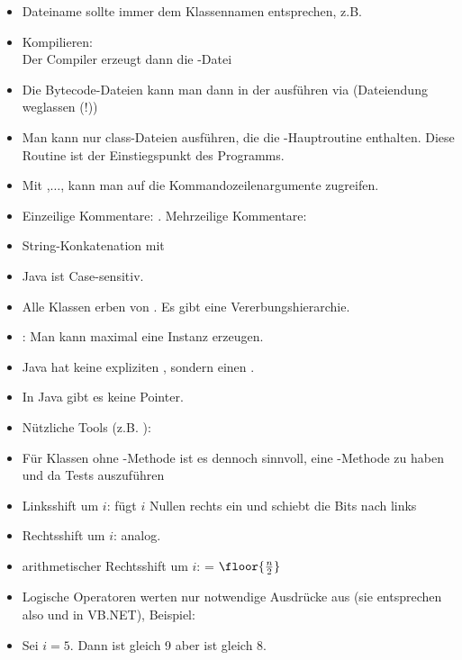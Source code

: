 \begin{itemize}
	\item Dateiname sollte immer dem Klassennamen entsprechen, z.B. 
	\item Kompilieren: \\
	Der Compiler erzeugt dann die -Datei 
	\item Die Bytecode-Dateien kann man dann in der  ausführen via  (Dateiendung weglassen (!))
	\item Man kann nur class-Dateien ausführen, die die -Hauptroutine enthalten.
	Diese Routine ist der Einstiegspunkt des Programms.
	\item Mit ,$\ldots$, kann man auf die Kommandozeilenargumente zugreifen.
	\item Einzeilige Kommentare: . Mehrzeilige Kommentare: \code{/*$\ldots$*/}
	\item String-Konkatenation mit \code{+}
	\item Java ist Case-sensitiv.
	\item Alle Klassen erben von . 
	Es gibt eine Vererbungshierarchie.
	\item {}: Man kann maximal eine Instanz erzeugen.
	\item Java hat keine expliziten , sondern einen .
	\item In Java gibt es keine Pointer.
	\item Nützliche Tools (z.B. ):
	\item Für Klassen ohne -Methode ist es dennoch sinnvoll, eine -Methode zu haben und da Tests auszuführen
	\item Linksshift um $i$:  fügt $i$ Nullen rechts ein und schiebt die Bits nach links
	\item Rechtsshift um $i$:  analog.
	\item arithmetischer Rechtsshift um $i$:  = $\floor{\frac{n}{2}}$
	\item Logische Operatoren werten nur notwendige Ausdrücke aus (sie entsprechen also  und  in VB.NET), Beispiel:\\
	\item Sei $i=5$. Dann ist  gleich 9 aber  ist gleich 8.
\end{itemize}

